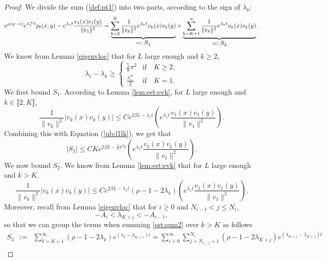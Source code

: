 \documentclass[11pt]{article}
\theoremstyle{plain}
\newcommand\linf{\lambda_1^\infty}
\begin{document}
\begin{proof} We divide the sum (\ref{def:pt1}) into two parts, according to the sign of $\lambda_k$:
\begin{equation}    \label{eq:sum}
e^{\mu(y-x)}e^{\linf t} p_t(x,y)- e^{\lambda_1 t}\frac{v_1(x)v_1(y)}{\|v_1\|^2} = \underbrace{\sum_{k=2}^K\frac{1}{\|v_k\|^2}e^{\lambda_k t}v_k(x)v_k(y)}_{%
    \let\scriptstyle\textstyle
    \substack{=:S_1}}+\underbrace{\sum_{k=K+1}^\infty\frac{1}{\|v_k\|^2}e^{\lambda_k t}v_k(x)v_k(y)}_{%
    \let\scriptstyle\textstyle
    \substack{=:S_2}}.
\end{equation}
We know from Lemma \ref{eigenvloc} that for $L$ large enough and $k\geqslant 2$, 
\begin{equation}\label{ub:l1lk}
\lambda_1-\lambda_k\geqslant \begin{cases}\frac{5}{8}\pi^2 &\text{if} \quad K\geqslant 2,\\
\frac{\linf}{2} & \text{if} \quad  K=1.\end{cases}
\end{equation} 
We first bound $S_1$. According to Lemma \ref{lem:est:evk}, for $L$ large enough and $k\in\llbracket2,K\rrbracket$, 
\begin{equation*}
         \frac{1}{\|v_k\|^2}\left|v_k(x)v_k(y)\right|\leqslant  C e^{2\beta L-\lambda_1 t}\left(e^{\lambda_1 t}\frac{v_1(x)v_1(y)}{\|v_1\|^2}\right).
    \end{equation*}
Combining this with Equation (\ref{ub:l1lk}), we get that 
\begin{equation}
   \left|S_1\right|\leqslant CKe^{2\beta L-\frac{5}{8}\pi^2 t}\left(e^{\lambda_1 t}\frac{v_1(x)v_1(y)}{\|v_1\|^2}\right).
    \label{est:sum1}
\end{equation}
We now bound $S_2$. We know from Lemma \ref{lem:est:evk} that for $L$ large enough  and  $k>K$, 
\begin{equation}
     \frac{1}{\|v_k\|^2}\left|v_k(x)v_k(y)\right|\leqslant C e^{2\beta L-\lambda_1 t}(\rho-1-2\lambda_k)\left(e^{\lambda_1 t}\frac{v_1(x)v_1(y)}{\|v_1\|^2}\right).     \label{est:sum2}
     \end{equation}
Moreover, recall from
Lemma \ref{eigenvloc} that for $i\geq 0$ and $N_{i-1}<j\leqslant N_i$,  $$-A_i<\lambda_{K+j}<-A_{i-1},$$ so that we can group the terms when summing \eqref{est:sum2} over $k>K$ as follows
\begin{eqnarray}
S_3&:=&\sum_{k=K+1}^\infty(\rho-1-2\lambda_k)e^{(\lambda_k-\lambda_{K+1})t}=\sum_{i=0}^\infty\sum_{j=N_{i-1}+1}^{N_i}(\rho-1-2\lambda_{K+j})e^{(\lambda_{K+j}-\lambda_{K+1})t}\label{est:sum3}\\

\end{eqnarray}
\end{proof}
\end{document}
